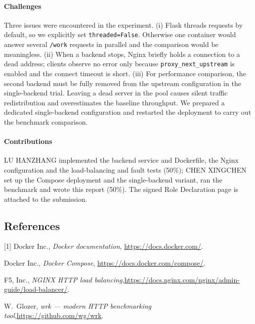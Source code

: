 \documentclass[11pt,a4paper]{article}
\begin{document}
\paragraph{Challenges}
Three issues were encountered in the experiment. (i) Flask threads requests by default, so we explicitly set \texttt{threaded=False}. Otherwise one container would answer several \texttt{/work} requests in parallel and the comparison would be meaningless. (ii) When a backend stops, Nginx briefly holds a connection to a dead address; clients observe no error only because \texttt{proxy\_next\_upstream} is enabled and the connect timeout is short. (iii) For performance comparison, the second backend must be fully removed from the upstream configuration in the single-backend trial. Leaving a dead server in the pool causes silent traffic redistribution and overestimates the baseline throughput. We prepared a dedicated single-backend configuration and restarted the deployment to carry out the benchmark comparison.
\paragraph{Contributions} LU HANZHANG implemented the backend service and
Dockerfile, the Nginx configuration and the load-balancing and fault tests
(50\%); CHEN XINGCHEN set up the Compose deployment and the
single-backend variant, ran the benchmark and wrote this report
(50\%). The signed Role Declaration page is attached to the submission.

{\footnotesize
\subsection*{References}
[1] Docker Inc., \emph{Docker documentation}, \url{https://docs.docker.com/}.\par
[2] Docker Inc., \emph{Docker Compose}, \url{https://docs.docker.com/compose/}.\par
[3] F5, Inc., \emph{NGINX HTTP load balancing},\url{https://docs.nginx.com/nginx/admin-guide/load-balancer/}.\par
[4] W.~Glozer, \emph{wrk --- modern HTTP benchmarking tool},\url{https://github.com/wg/wrk}.\par
}
\end{document}
